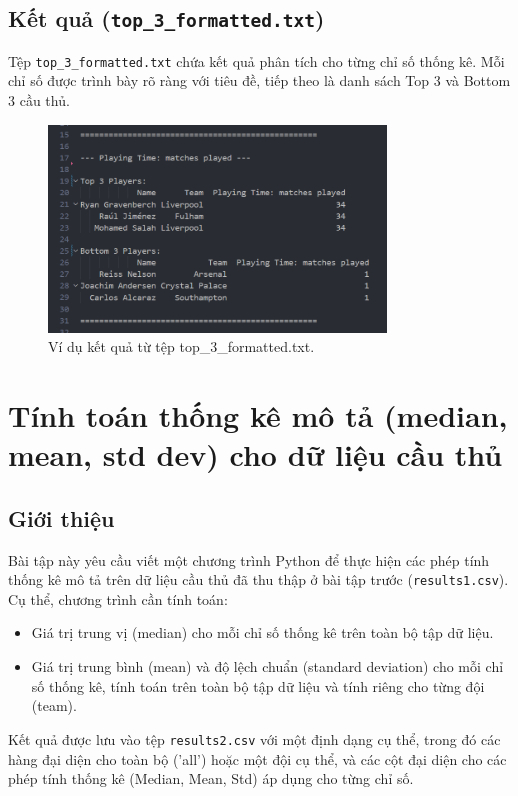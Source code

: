 \documentclass[12pt, a4paper]{report}
\begin{document}
\subsection{Kết quả (\texttt{top\_3\_formatted.txt})}
Tệp \texttt{top\_3\_formatted.txt} chứa kết quả phân tích cho từng chỉ số thống kê.
Mỗi chỉ số được trình bày rõ ràng với tiêu đề, tiếp theo là danh sách Top 3 và Bottom 3 cầu thủ.

\begin{figure}[H]
    \centering
    \includegraphics[width=0.8\textwidth]{top_3.png} 
    \caption{Ví dụ kết quả từ tệp top\_3\_formatted.txt.}
    \label{fig:top3_output}
\end{figure}

\section{Tính toán thống kê mô tả (median, mean, std dev) cho dữ liệu cầu thủ}

\subsection{Giới thiệu}
Bài tập này yêu cầu viết một chương trình Python để thực hiện các phép tính thống kê mô tả trên dữ liệu cầu thủ đã thu thập ở bài tập trước (\texttt{results1.csv}).
Cụ thể, chương trình cần tính toán:
\begin{itemize}
\renewcommand{\labelitemi}{}
    \item Giá trị trung vị (median) cho mỗi chỉ số thống kê trên toàn bộ tập dữ liệu.
    \item Giá trị trung bình (mean) và độ lệch chuẩn (standard deviation) cho mỗi chỉ số thống kê, tính toán trên toàn bộ tập dữ liệu và tính riêng cho từng đội (team).
\end{itemize}
Kết quả được lưu vào tệp \texttt{results2.csv} với một định dạng cụ thể, trong đó các hàng đại diện cho toàn bộ ('all') hoặc một đội cụ thể, và các cột đại diện cho các phép tính thống kê (Median, Mean, Std) áp dụng cho từng chỉ số.
\end{document}
